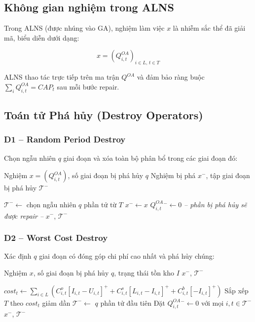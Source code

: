 \documentclass[12pt]{article}
\newcommand{\QOA}{Q^{OA}}
\newcommand{\pos}[1]{\left[#1\right]^+}
\begin{document}
\subsection{Không gian nghiệm trong ALNS}

Trong ALNS (được nhúng vào GA), nghiệm làm việc $x$ là nhiễm sắc thể đã giải mã, biểu diễn dưới dạng:

\[
  x = (\QOA_{i,t})_{i \in L,\, t \in T}
\]

ALNS thao tác trực tiếp trên ma trận $\QOA$ và đảm bảo ràng buộc $\sum_i \QOA_{i,t} = CAP_t$ sau mỗi bước repair.

\subsection{Toán tử Phá hủy (Destroy Operators)}

\subsubsection*{D1 -- Random Period Destroy}

Chọn ngẫu nhiên $q$ giai đoạn và xóa toàn bộ phân bổ trong các giai đoạn đó:

\begin{algorithm}[H]
\caption{D1: Random Period Destroy}
\label{alg:d1}
\begin{algorithmic}[1]
\Require Nghiệm $x = (\QOA_{i,t})$, số giai đoạn bị phá hủy $q$
\Ensure Nghiệm bị phá $x^-$, tập giai đoạn bị phá hủy $\mathcal{T}^-$

\State $\mathcal{T}^- \gets$ chọn ngẫu nhiên $q$ phần tử từ $T$
\State $x^- \gets x$
    \State $\QOA_{i,t}^- \gets 0$ \quad \textit{-- phần bị phá hủy sẽ được repair --}
  \EndFor
\EndFor
\State \Return $x^-$, $\mathcal{T}^-$

\end{algorithmic}
\end{algorithm}

\subsubsection*{D2 -- Worst Cost Destroy}

Xác định $q$ giai đoạn có đóng góp chi phí cao nhất và phá hủy chúng:

\begin{algorithm}[H]
\caption{D2: Worst Cost Destroy}
\label{alg:d2}
\begin{algorithmic}[1]
\Require Nghiệm $x$, số giai đoạn bị phá hủy $q$, trạng thái tồn kho $I$
\Ensure $x^-$, $\mathcal{T}^-$

  \State $cost_t \gets \sum_{i \in L}\left( C^o_{i,t}\pos{I_{i,t}-U_{i,t}} + C^s_{i,t}\pos{L_{i,t}-I_{i,t}} + C^b_{i,t}\pos{-I_{i,t}} \right)$
\EndFor
\State Sắp xếp $T$ theo $cost_t$ giảm dần
\State $\mathcal{T}^- \gets$ $q$ phần tử đầu tiên
\State Đặt $\QOA_{i,t}^- \gets 0$ với mọi $i, t \in \mathcal{T}^-$
\State \Return $x^-$, $\mathcal{T}^-$

\end{algorithmic}
\end{algorithm}
\end{document}
